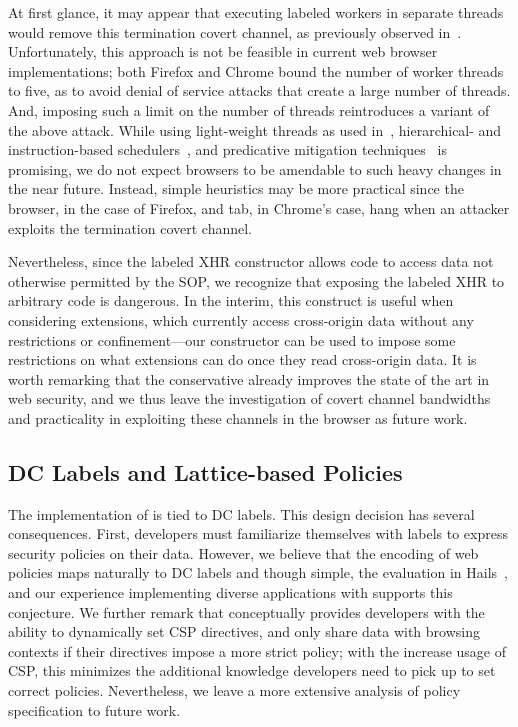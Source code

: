 At first glance, it may appear that executing labeled workers
in separate threads would remove this termination covert
channel, as previously observed in~\cite{stefan:addressing-covert}. 
%
Unfortunately, this approach is not be feasible in current web browser
implementations; both Firefox and Chrome bound the number of worker
threads to five, as to avoid denial of service
attacks that create a large number of threads.
%
And, imposing such a limit on the number of threads
reintroduces a variant of the above attack.
%
While using light-weight threads as used in~\cite{stefan:addressing-covert},
hierarchical- and instruction-based
schedulers~\cite{stefan:2013:eliminating,buiras2013library}, and predicative
mitigation techniques~\cite{askarov:termination-insensitive} is promising, we do
not expect browsers to be amendable to such heavy changes in the near
future.
%
Instead, simple heuristics may be more practical since the browser,
in the case of Firefox, and tab, in Chrome's case, hang when an
attacker exploits the termination covert channel.

Nevertheless, since the labeled XHR constructor allows code to access
data not otherwise permitted by the SOP, we recognize that exposing
the labeled XHR to arbitrary code is dangerous.
%
In the interim, this construct is useful when considering extensions,
which currently access cross-origin data without any restrictions or
confinement---our constructor can be used to impose some restrictions
on what extensions can do once they read cross-origin data.
%
%
It is worth remarking that the conservative \sys{} already improves
the state of the art in web security, and we thus leave the
investigation of covert channel bandwidths and practicality in
exploiting these channels in the browser as future work.

\subsection{DC Labels and Lattice-based Policies}
\label{sec:discussion:lattice}

The implementation of \sys{} is tied to DC labels.
%
This design decision has several consequences.
%
First, developers must familiarize themselves with labels to express
security policies on their data.
%
However, we believe that the encoding of web policies maps naturally
to DC labels and though simple, the evaluation in
Hails~\cite{giffin:2012:hails}, and our experience implementing diverse
applications with \sys{} supports this conjecture.
%
We further remark that \sys{} conceptually provides developers with
the ability to dynamically set CSP directives, and only share data
with browsing contexts if their directives impose a more strict
policy; with the increase usage of CSP, this minimizes the additional
knowledge developers need to pick up to set correct policies.
%
Nevertheless, we leave a more extensive analysis of policy
specification to future work.
 
